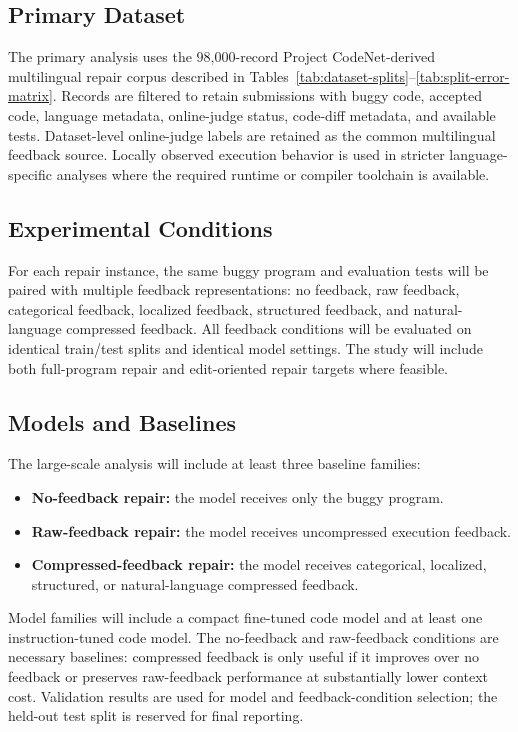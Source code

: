 \documentclass[conference]{IEEEtran}
\begin{document}
\subsection{Primary Dataset}

The primary analysis uses the 98,000-record Project CodeNet-derived multilingual repair corpus described in Tables~\ref{tab:dataset-splits}--\ref{tab:split-error-matrix}. Records are filtered to retain submissions with buggy code, accepted code, language metadata, online-judge status, code-diff metadata, and available tests. Dataset-level online-judge labels are retained as the common multilingual feedback source. Locally observed execution behavior is used in stricter language-specific analyses where the required runtime or compiler toolchain is available.

\subsection{Experimental Conditions}

For each repair instance, the same buggy program and evaluation tests will be paired with multiple feedback representations: no feedback, raw feedback, categorical feedback, localized feedback, structured feedback, and natural-language compressed feedback. All feedback conditions will be evaluated on identical train/test splits and identical model settings. The study will include both full-program repair and edit-oriented repair targets where feasible.

\subsection{Models and Baselines}

The large-scale analysis will include at least three baseline families:

\begin{itemize}
    \item \textbf{No-feedback repair:} the model receives only the buggy program.
    \item \textbf{Raw-feedback repair:} the model receives uncompressed execution feedback.
    \item \textbf{Compressed-feedback repair:} the model receives categorical, localized, structured, or natural-language compressed feedback.
\end{itemize}

Model families will include a compact fine-tuned code model and at least one instruction-tuned code model. The no-feedback and raw-feedback conditions are necessary baselines: compressed feedback is only useful if it improves over no feedback or preserves raw-feedback performance at substantially lower context cost. Validation results are used for model and feedback-condition selection; the held-out test split is reserved for final reporting.
\end{document}
